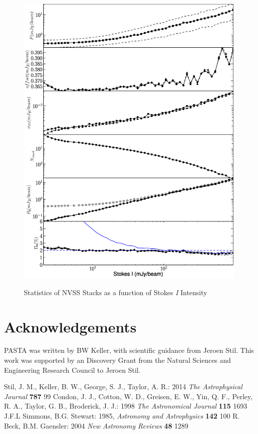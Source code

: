 \documentclass{article}
\begin{document}
\begin{figure}[H]
\begin{center}
\includegraphics[trim=2cm 0cm 0cm 0cm, clip, scale=0.61]{NVSS.eps}\\
\end{center}
\caption[NVSS Stacking Statistics]{Statistics of NVSS Stacks as a function of 
Stokes \emph{I} Intensity}
\end{figure}

\section{Acknowledgements}
PASTA was written by BW Keller, with scientific guidance from Jeroen Stil.  This
work was supported by an Discovery Grant from the Natural Sciences and
Engineering Research Council to Jeroen Stil.


\renewcommand{\refname}{\section{References}}
\begin{thebibliography}{1}
    Stil, J. M., Keller, B. W., George, S. J., Taylor, A. R.: 2014
        \emph{The Astrophysical Journal} {\bf 787} 99
	Condon, J. J., Cotton, W. D., Greisen, E. W., Yin, Q. F., 
	Perley, R. A., Taylor, G. B., Broderick, J. J.: 1998
	\emph{The Astronomical Journal} {\bf 115} 1693
	J.F.L Simmons, B.G. Stewart: 1985, 
	\emph{Astronomy and Astrophysics} {\bf 142} 100
	R. Beck, B.M. Gaensler: 2004
	\emph{New Astronomy Reviews} {\bf 48} 1289
\end{thebibliography}
\end{document}
